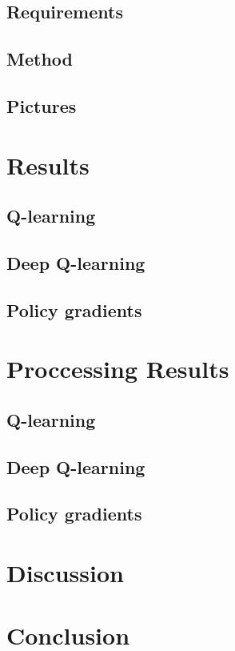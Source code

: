 \documentclass{article}
\begin{document}
\subsection{Requirements}
\subsection{Method}
\subsection{Pictures}

\section{Results}
\subsection{Q-learning}
\subsection{Deep Q-learning}
\subsection{Policy gradients}

\section{Proccessing Results}
\subsection{Q-learning}
\subsection{Deep Q-learning}
\subsection{Policy gradients}

\section{Discussion}

\section{Conclusion}
\end{document}
